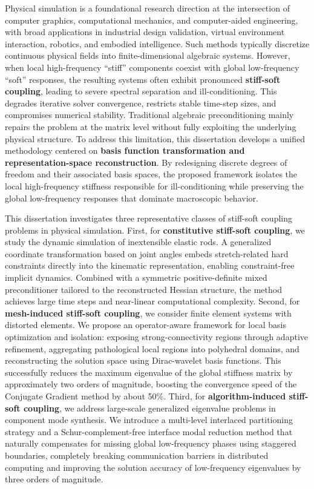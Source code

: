 Physical simulation is a foundational research direction at the intersection of computer graphics, computational mechanics, and computer-aided engineering, with broad applications in industrial design validation, virtual environment interaction, robotics, and embodied intelligence. Such methods typically discretize continuous physical fields into finite-dimensional algebraic systems. However, when local high-frequency ``stiff'' components coexist with global low-frequency ``soft'' responses, the resulting systems often exhibit pronounced \textbf{stiff-soft coupling}, leading to severe spectral separation and ill-conditioning. This degrades iterative solver convergence, restricts stable time-step sizes, and compromises numerical stability. Traditional algebraic preconditioning mainly repairs the problem at the matrix level without fully exploiting the underlying physical structure. To address this limitation, this dissertation develops a unified methodology centered on \textbf{basis function transformation and representation-space reconstruction}. By redesigning discrete degrees of freedom and their associated basis spaces, the proposed framework isolates the local high-frequency stiffness responsible for ill-conditioning while preserving the global low-frequency responses that dominate macroscopic behavior.

This dissertation investigates three representative classes of stiff-soft coupling problems in physical simulation. First, for \textbf{constitutive stiff-soft coupling}, we study the dynamic simulation of inextensible elastic rods. A generalized coordinate transformation based on joint angles embeds stretch-related hard constraints directly into the kinematic representation, enabling constraint-free implicit dynamics. Combined with a symmetric positive-definite mixed preconditioner tailored to the reconstructed Hessian structure, the method achieves large time steps and near-linear computational complexity. Second, for \textbf{mesh-induced stiff-soft coupling}, we consider finite element systems with distorted elements. We propose an operator-aware framework for local basis optimization and isolation: exposing strong-connectivity regions through adaptive refinement, aggregating pathological local regions into polyhedral domains, and reconstructing the solution space using Dirac-wavelet basis functions. This successfully reduces the maximum eigenvalue of the global stiffness matrix by approximately two orders of magnitude, boosting the convergence speed of the Conjugate Gradient method by about 50\%. Third, for \textbf{algorithm-induced stiff-soft coupling}, we address large-scale generalized eigenvalue problems in component mode synthesis. We introduce a multi-level interlaced partitioning strategy and a Schur-complement-free interface modal reduction method that naturally compensates for missing global low-frequency phases using staggered boundaries, completely breaking communication barriers in distributed computing and improving the solution accuracy of low-frequency eigenvalues by three orders of magnitude.

